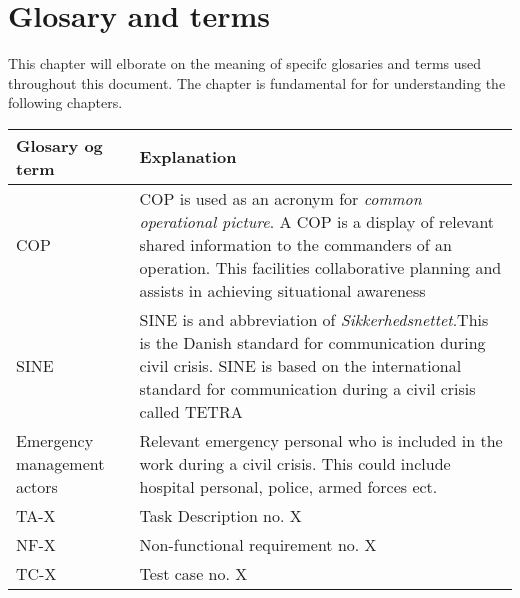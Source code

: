 \label{chp_revisionHistory}
\chapter{Glosary and terms}

This chapter will elborate on the meaning of specifc glosaries and terms used throughout this document. The chapter is fundamental for for understanding the following chapters.

\begin{longtable}{| p{3.5cm} |  p{10cm} | }
	\hline
	\textbf{Glosary og term} &  \textbf{Explanation } \\
	\hline
	COP & COP is used as an acronym for \emph{common operational picture}. A COP is a display of relevant shared information to the commanders of an operation. This facilities collaborative planning and assists in achieving situational awareness \\
	\hline
	SINE & SINE is and abbreviation of \emph{Sikkerhedsnettet}.This is the Danish standard for communication during civil crisis. SINE is based on the international standard for communication during a civil crisis called TETRA\\
	\hline
	Emergency management actors & Relevant emergency personal who is included in the work during a civil crisis. This could include hospital personal, police, armed forces ect.  \\
	\hline
	TA-X & Task Description no. X \\
	\hline
	NF-X & Non-functional requirement no. X \\
	\hline
	TC-X & Test case no. X \\
	\hline
\end{longtable}